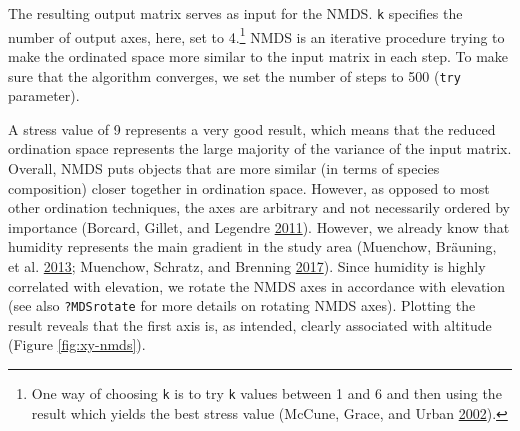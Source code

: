 \documentclass[]{krantz}
\newenvironment{Shaded}{\begin{snugshade}}{\end{snugshade}}
\newcommand{\CommentTok}[1]{\textcolor[rgb]{0.37,0.37,0.37}{\textit{#1}}}
\newcommand{\DataTypeTok}[1]{\textcolor[rgb]{0.27,0.27,0.27}{#1}}
\newcommand{\DecValTok}[1]{\textcolor[rgb]{0.06,0.06,0.06}{#1}}
\newcommand{\KeywordTok}[1]{\textcolor[rgb]{0.27,0.27,0.27}{\textbf{#1}}}
\newcommand{\NormalTok}[1]{#1}
\newcommand{\OperatorTok}[1]{\textcolor[rgb]{0.43,0.43,0.43}{\textbf{#1}}}
\newcommand{\StringTok}[1]{\textcolor[rgb]{0.5,0.5,0.5}{#1}}
\let\rmarkdownfootnote\footnote%
\def\footnote{\protect\rmarkdownfootnote}
\begin{document}
The resulting output matrix serves as input for the NMDS.
\texttt{k} specifies the number of output axes, here, set to 4.\footnote{One way of choosing \texttt{k} is to try \texttt{k} values between 1 and 6 and then using the result which yields the best stress value (McCune, Grace, and Urban \protect\hyperlink{ref-mccune_analysis_2002}{2002}).}
NMDS is an iterative procedure trying to make the ordinated space more similar to the input matrix in each step.
To make sure that the algorithm converges, we set the number of steps to 500 (\texttt{try} parameter).

\begin{Shaded}
\end{Shaded}

A stress value of 9 represents a very good result, which means that the reduced ordination space represents the large majority of the variance of the input matrix.
Overall, NMDS puts objects that are more similar (in terms of species composition) closer together in ordination space.
However, as opposed to most other ordination techniques, the axes are arbitrary and not necessarily ordered by importance (Borcard, Gillet, and Legendre \protect\hyperlink{ref-borcard_numerical_2011}{2011}).
However, we already know that humidity represents the main gradient in the study area (Muenchow, Bräuning, et al. \protect\hyperlink{ref-muenchow_predictive_2013}{2013}; Muenchow, Schratz, and Brenning \protect\hyperlink{ref-muenchow_rqgis:_2017}{2017}).
Since humidity is highly correlated with elevation, we rotate the NMDS axes in accordance with elevation (see also \texttt{?MDSrotate} for more details on rotating NMDS axes).
Plotting the result reveals that the first axis is, as intended, clearly associated with altitude (Figure \ref{fig:xy-nmds}).
\end{document}
